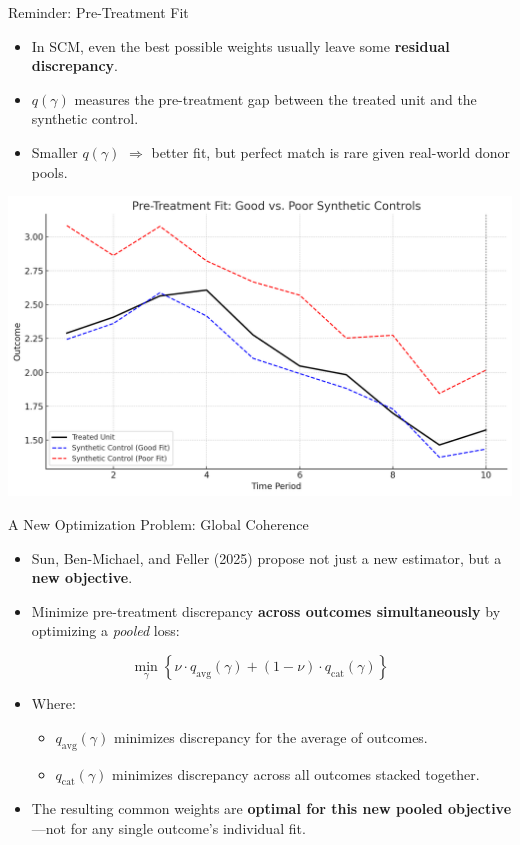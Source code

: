 \documentclass{beamer}
\begin{document}
\begin{frame}{Reminder: Pre-Treatment Fit}
  \begin{itemize}
    \item In SCM, even the best possible weights usually leave some \textbf{residual discrepancy}.
    \item $q(\gamma)$ measures the pre-treatment gap between the treated unit and the synthetic control.
    \item Smaller $q(\gamma)$ $\Rightarrow$ better fit, but perfect match is rare given real-world donor pools.
  \end{itemize}
  \vspace{0.5cm}
  \begin{center}
  \includegraphics[width=0.65\linewidth]{./lecture_includes/reminder_fit.png}
  \end{center}
\end{frame}

\begin{frame}{A New Optimization Problem: Global Coherence}
  \begin{itemize}
    \item Sun, Ben-Michael, and Feller (2025) propose not just a new estimator, but a \textbf{new objective}.
    \item Minimize pre-treatment discrepancy \textbf{across outcomes simultaneously} by optimizing a \textit{pooled} loss:
  \end{itemize}
  \[
    \min_{\gamma} \left\{ \nu \cdot q_{\text{avg}}(\gamma) + (1 - \nu) \cdot q_{\text{cat}}(\gamma) \right\}
  \]
  \begin{itemize}
    \item Where:
    \begin{itemize}
      \item $q_{\text{avg}}(\gamma)$ minimizes discrepancy for the average of outcomes.
      \item $q_{\text{cat}}(\gamma)$ minimizes discrepancy across all outcomes stacked together.
    \end{itemize}
    \item The resulting common weights are \textbf{optimal for this new pooled objective}—not for any single outcome’s individual fit.
  \end{itemize}
\end{frame}
\end{document}
